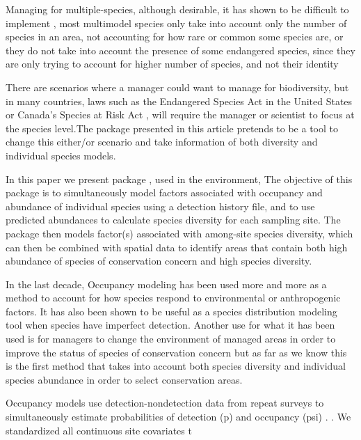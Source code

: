 \documentclass[article]{jss}
\begin{document}
Managing for multiple-species, although desirable, it has shown to be
difficult to implement
\citep{mollmann2014implementing, lmgren2015baltic}, most multimodel
species only take into account only the number of species in an area,
not accounting for how rare or common some species are, or they do not
take into account the presence of some endangered species, since they
are only trying to account for higher number of species, and not their
identity
\citep{taft2002waterbird, tori2002wetland, plaganyi2014multispecies}

There are scenarios where a manager could want to manage for
biodiversity, but in many countries, laws such as the Endangered Species
Act in the United States or Canada's Species at Risk Act
\citep{congress1973endangered, waples2013tale}, will require the manager
or scientist to focus at the species level.The package presented in this
article pretends to be a tool to change this either/or scenario and take
information of both diversity and individual species models.

In this paper we present package , used in the
 environment, The objective of this package is to
simultaneously model factors associated with occupancy and abundance of
individual species using a detection history file, and to use predicted
abundances to calculate species diversity for each sampling site. The
package then models factor(s) associated with among-site species
diversity, which can then be combined with spatial data to identify
areas that contain both high abundance of species of conservation
concern and high species diversity.

In the last decade, Occupancy modeling has been used more and more as a
method to account for how species respond to environmental or
anthropogenic factors. It has also been shown to be useful as a species
distribution modeling tool when species have imperfect detection.
Another use for what it has been used is for managers to change the
environment of managed areas in order to improve the status of species
of conservation concern
\citep{mackenzie_estimating_2002, mackenzie2006occupancy} but as far as
we know this is the first method that takes into account both species
diversity and individual species abundance in order to select
conservation areas.

Occupancy models use detection-nondetection data from repeat surveys to
simultaneously estimate probabilities of detection (p) and occupancy
(psi) \citep{mackenzie2006occupancy}. \citep{burnham2003model}. We
standardized all continuous site covariates t
\end{document}
